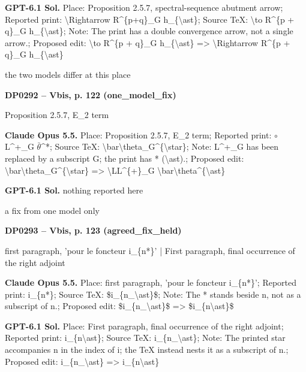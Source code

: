 \textbf{GPT-6.1 Sol.} Place: Proposition 2.5.7, spectral-sequence abutment arrow; Reported print: \textbackslash{}Rightarrow R\textasciicircum{}\{p+q\}\_G h\_\{\textbackslash{}ast\}; Source TeX: \textbackslash{}to R\textasciicircum{}\{p + q\}\_G h\_\{\textbackslash{}ast\}; Note: The print has a double convergence arrow, not a single arrow.; Proposed edit: \textbackslash{}to R\textasciicircum{}\{p + q\}\_G h\_\{\textbackslash{}ast\} =\allowbreak > \textbackslash{}Rightarrow R\textasciicircum{}\{p + q\}\_G h\_\{\textbackslash{}ast\}\par
the two models differ at this place\par
\par\noindent\hypertarget{DP0292}{}\textbf{DP0292 -- Vbis, p. 122 (one\_model\_fix)}\par
Proposition 2.5.7, E\_2 term\par
\textbf{Claude Opus 5.5.} Place: Proposition 2.5.7, E\_2 term; Reported print: \ensuremath{\circ} L\textasciicircum{}+\_G \ensuremath{\bar{\theta}}\textasciicircum{}*; Source TeX: \textbackslash{}bar\textbackslash{}theta\_G\textasciicircum{}\{\textbackslash{}star\}; Note: L\textasciicircum{}+\_G has been replaced by a subscript G; the print has * (\textbackslash{}ast).; Proposed edit: \textbackslash{}bar\textbackslash{}theta\_G\textasciicircum{}\{\textbackslash{}star\} =\allowbreak > \textbackslash{}LL\textasciicircum{}\{+\}\_G \textbackslash{}bar\textbackslash{}theta\textasciicircum{}\{\textbackslash{}ast\}\par
\textbf{GPT-6.1 Sol.} nothing reported here\par
a fix from one model only\par
\par\noindent\hypertarget{DP0293}{}\textbf{DP0293 -- Vbis, p. 123 (agreed\_fix\_held)}\par
first paragraph, 'pour le foncteur i\_\{n*\}' | First paragraph, final occurrence of the right adjoint\par
\textbf{Claude Opus 5.5.} Place: first paragraph, 'pour le foncteur i\_\{n*\}'; Reported print: i\_\{n*\}; Source TeX: \$i\_\{n\_\textbackslash{}ast\}\$; Note: The * stands beside n, not as a subscript of n.; Proposed edit: \$i\_\{n\_\textbackslash{}ast\}\$ =\allowbreak > \$i\_\{n\textbackslash{}ast\}\$\par
\textbf{GPT-6.1 Sol.} Place: First paragraph, final occurrence of the right adjoint; Reported print: i\_\{n\textbackslash{}ast\}; Source TeX: i\_\{n\_\textbackslash{}ast\}; Note: The printed star accompanies n in the index of i; the TeX instead nests it as a subscript of n.; Proposed edit: i\_\{n\_\textbackslash{}ast\} =\allowbreak > i\_\{n\textbackslash{}ast\}\par

